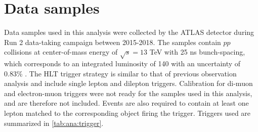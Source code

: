 \documentclass[../thesis.tex]{subfiles}
\begin{document}
\vspace{-1\baselineskip}

\section{Data samples}
\label{sec:data}
Data samples used in this analysis were collected by the \acs{ATLAS} detector during Run 2 data-taking campaign between 2015-2018. The samples contain $pp$ collisions at center-of-mass energy of $\sqrt{s}=13$ TeV with 25 ns bunch-spacing, which corresponds to an integrated luminosity of 140 \fb with an uncertainty of 0.83\% \citep{DAPR-2021-01}. The \acs{HLT} trigger strategy is similar to that of previous \tttt observation analysis \citep{tttt_obs} and include single lepton and dilepton triggers. Calibration for di-muon and electron-muon triggers were not ready for the samples used in this analysis, and are therefore not included. Events are also required to contain at least one lepton matched to the corresponding object firing the trigger. Triggers used are summarized in \autoref{tab:ana:trigger}.
\end{document}
